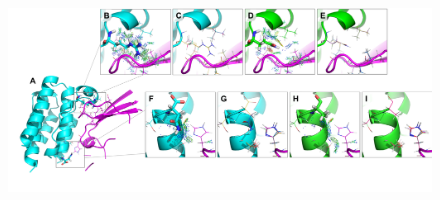 
\begin{figure}\label{fig:designs}
 \center
 \includegraphics[width=\textwidth]{figures/designExamples.png}
 \caption{}
\end{figure}


